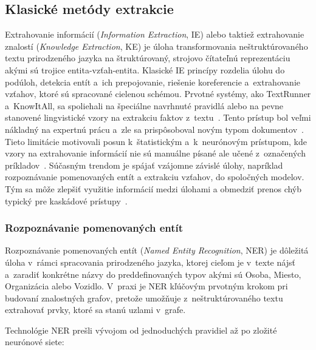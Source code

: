 \subsection{Klasické metódy extrakcie}

Extrahovanie informácií (\textit{Information Extraction}, IE) alebo taktiež extrahovanie znalostí (\textit{Knowledge Extraction}, KE) je úloha transformovania neštruktúrovaného textu prirodzeného jazyka na štruktúrovaný, strojovo čítateľnú reprezentáciu akými sú trojice entita-vzťah-entita. Klasické IE princípy rozdelia úlohu do podúloh, detekcia entít a~ich prepojovanie, riešenie koreferencie a~extrahovanie vzťahov, ktoré sú spracované cielenou schémou. Prvotné systémy, ako TextRunner a~KnowItAll, sa spoliehali na špeciálne navrhnuté pravidlá alebo na pevne stanovené lingvistické vzory na extrakciu faktov z~textu~\cite{autKGconstruction2023}. Tento prístup bol veľmi nákladný na expertnú prácu a~zle sa prispôsoboval novým typom dokumentov~\cite{autKGconstruction2023}. Tieto limitácie motivovali posun k~štatistickým a~k~neurónovým prístupom, kde vzory na extrahovanie informácií nie sú manuálne písané ale učené z~označených príkladov~\cite{moncecchiRE2010}. Súčasným trendom je spájať vzájomne závislé úlohy, napríklad rozpoznávanie pomenovaných entít a extrakciu vzťahov, do spoločných modelov. Tým sa môže zlepšiť využitie informácií medzi úlohami a obmedziť prenos chýb typický pre kaskádové prístupy~\cite{hogan2021kg}.


\subsubsection{Rozpoznávanie pomenovaných entít}

Rozpoznávanie pomenovaných entít (\textit{Named Entity Recognition}, NER) je dôležitá úloha v~rámci spracovania prirodzeného jazyka, ktorej cieľom je v~texte nájsť a~zaradiť konkrétne názvy do preddefinovaných typov akými sú Osoba, Miesto, Organizácia alebo Vozidlo. V~praxi je NER kľúčovým prvotným krokom pri budovaní znalostných grafov, pretože umožňuje z~neštruktúrovaného textu extrahovať prvky, ktoré sa stanú uzlami v~grafe.

Technológie NER prešli vývojom od jednoduchých pravidiel až po zložité neurónové siete:


